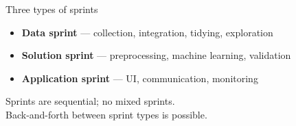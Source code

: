\begin{frame}{Three types of sprints}
  \begin{itemize}
    \item \textbf{Data sprint} --- collection, integration, tidying, exploration
    \item \textbf{Solution sprint} --- preprocessing, machine learning, validation
    \item \textbf{Application sprint} --- UI, communication, monitoring
  \end{itemize}

  \vspace{0.3cm}
  Sprints are sequential; no mixed sprints.\\
  Back-and-forth between sprint types is possible.
\end{frame}


